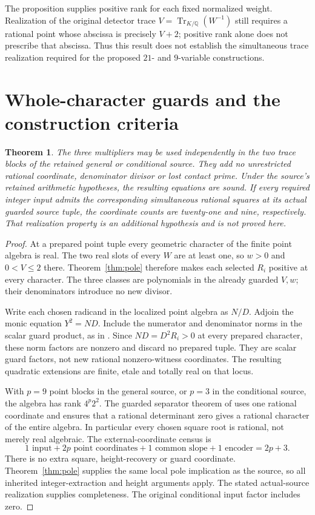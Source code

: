 \documentclass[11pt,a4paper]{article}
\newtheorem{theorem}{Theorem}[section]
\newcommand{\Q}{\mathbb Q}\newcommand{\Z}{\mathbb Z}
\DeclareMathOperator{\Tr}{Tr}\DeclareMathOperator{\Nm}{N}
\begin{document}
The proposition supplies positive rank for each fixed normalized
weight. Realization of the original detector trace
$V=\Tr_{K/\Q}(W^{-1})$ still requires a rational point whose
abscissa is precisely $V+2$; positive rank alone does not prescribe
that abscissa. Thus this result does not establish the simultaneous
trace realization required for the proposed $21$- and $9$-variable
constructions.

\section{Whole-character guards and the construction criteria}

\begin{theorem}\label{thm:encoding}
The three multipliers may be used independently in the two trace
blocks of the retained general or conditional source. They add no
unrestricted rational coordinate, denominator divisor or lost
contact prime. Under the source's retained arithmetic hypotheses,
the resulting equations are sound. If every required integer input
admits the corresponding simultaneous rational squares at its actual
guarded source tuple, the coordinate counts are twenty-one and nine,
respectively. That realization property is an additional hypothesis
and is not proved here.
\end{theorem}
\begin{proof}
At a prepared point tuple every geometric character of the finite
point algebra is real. The two real slots of every $W$ are at least
one, so $w>0$ and $0<V\le2$ there. Theorem~\ref{thm:pole}
therefore makes each selected $R_i$ positive at every character.
The three classes are polynomials in the already guarded $V,w$;
their denominators introduce no new divisor.

Write each chosen radicand in the localized point algebra as $N/D$.
Adjoin the monic equation $Y^2=ND$. Include the numerator and
denominator norms in the scalar guard product, as in \cite{Unit}.
Since $ND=D^2R_i>0$ at every prepared character, these norm factors
are nonzero and discard no prepared tuple. They are scalar guard
factors, not new rational nonzero-witness coordinates. The resulting
quadratic extensions are finite, etale and totally real on that locus.

With $p=9$ point blocks in the general source, or $p=3$ in the
conditional source, the algebra has rank $4^p2^2$. The guarded
separator theorem of \cite{Unit} uses one rational coordinate and
ensures that a rational determinant zero gives a rational character
of the entire algebra. In particular every chosen square root is
rational, not merely real algebraic. The external-coordinate census is
\[
 1\text{ input}+2p\text{ point coordinates}
          +1\text{ common slope}+1\text{ encoder}=2p+3.
\]
There is no extra square, height-recovery or guard coordinate.
Theorem~\ref{thm:pole} supplies the same local pole implication as
the source, so all inherited integer-extraction and height arguments
apply. The stated actual-source realization supplies completeness.
The original conditional input factor includes zero.
\end{proof}
\end{document}

